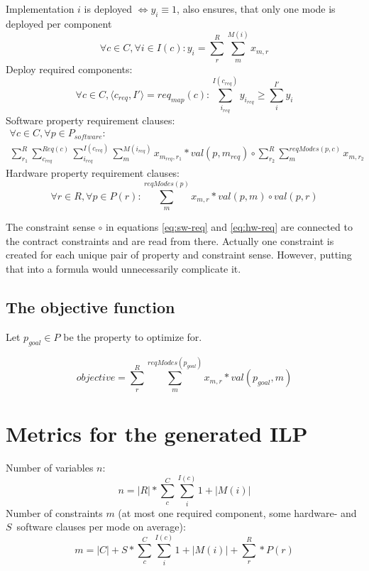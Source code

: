 \documentclass[10pt,a4paper]{article}
\begin{document}
Implementation $i$ is deployed $\Leftrightarrow y_i \equiv 1$, also ensures, that only one mode is deployed per component
\begin{equation}
	\forall c \in C, \forall i \in I(c): y_i = \sum_{r}^{R} \sum_{m}^{M(i)} x_{m,r} \label{eq:impl-shortcut}
\end{equation}
Deploy required components:
\begin{equation}
	\forall c \in C, \langle c_{req}, I' \rangle = req_{map}(c):
	\sum_{i_{req}}^{I(c_{req})} y_{i_{req}} \geq \sum_{i}^{I'} y_i
	\label{eq:req-comp}
\end{equation}
Software property requirement clauses:
\begin{multline}
	\forall c \in C, \forall p \in P_{software}: \\
	\sum_{r_1}^{R} \sum_{c_{req}}^{Req(c)} \sum_{i_{req}}^{I(c_{req})} \sum_m^{M(i_{req})} x_{m_{req},r_1} * val (p, m_{req}) \label{eq:sw-req} \circ \sum_{r_2}^{R} \sum_{m}^{reqModes(p,c)} x_{m,r_2}
\end{multline}
Hardware property requirement clauses:
\begin{equation}
	\forall r \in R, \forall p \in P(r): \sum_{m}^{reqModes(p)} x_{m,r} * val(p,m) \circ val(p,r) \label{eq:hw-req}
\end{equation}

The constraint sense $\circ$ in equations \eqref{eq:sw-req} and \eqref{eq:hw-req} are connected to the contract constraints and are read from there. Actually one constraint is created for each unique pair of property and constraint sense. However, putting that into a formula would unnecessarily complicate it.

\subsection{The objective function}

Let $p_{goal} \in P$ be the property to optimize for.

\begin{equation}
	objective = \sum_{r}^{R} \sum_{m}^{reqModes(p_{goal})} x_{m,r} * val(p_{goal},m)
\end{equation}

\section{Metrics for the generated ILP}

Number of variables $n$:
\begin{equation}
n = |R| * \sum_{c}^{C} \sum_{i}^{I(c)} 1 + |M(i)|
\end{equation}
%
Number of constraints $m$ (at most one required component, some hardware- and $S$~software clauses per mode on average):
\begin{equation}
m = |C| + %
S * \sum_{c}^{C} \sum_{i}^{I(c)} 1 + |M(i)| + %
\sum_r^{R} * P(r)
\end{equation}
\end{document}
